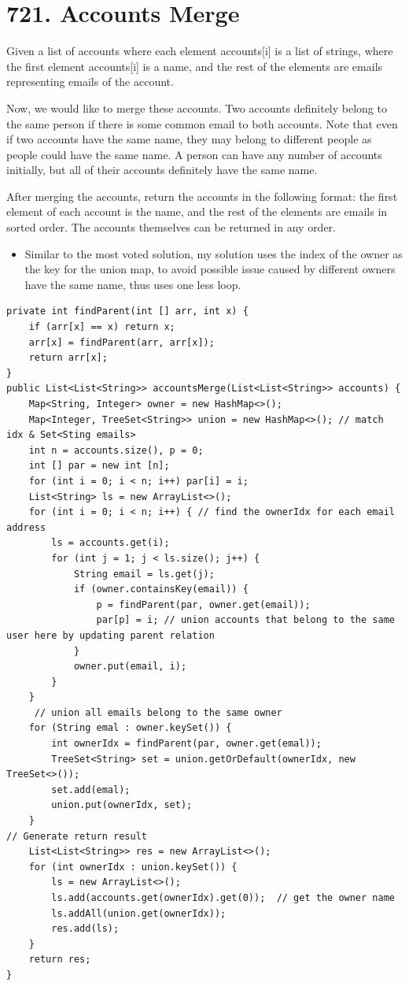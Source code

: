 \documentclass[9pt, b5paaper]{book}
\begin{document}
\section{721. Accounts Merge}
\label{sec-17-4}
Given a list of accounts where each element accounts[i] is a list of strings, where the first element accounts[i]\footnotemark[2]{} is a name, and the rest of the elements are emails representing emails of the account.

Now, we would like to merge these accounts. Two accounts definitely belong to the same person if there is some common email to both accounts. Note that even if two accounts have the same name, they may belong to different people as people could have the same name. A person can have any number of accounts initially, but all of their accounts definitely have the same name.

After merging the accounts, return the accounts in the following format: the first element of each account is the name, and the rest of the elements are emails in sorted order. The accounts themselves can be returned in any order.

\begin{itemize}
\item Similar to the most voted solution, my solution uses the index of the owner as the key for the union map, to avoid possible issue caused by different owners have the same name, thus uses one less loop.
\end{itemize}

\begin{verbatim}
private int findParent(int [] arr, int x) {
    if (arr[x] == x) return x;
    arr[x] = findParent(arr, arr[x]);
    return arr[x];
}
public List<List<String>> accountsMerge(List<List<String>> accounts) {
    Map<String, Integer> owner = new HashMap<>();
    Map<Integer, TreeSet<String>> union = new HashMap<>(); // match idx & Set<Sting emails>
    int n = accounts.size(), p = 0;
    int [] par = new int [n];
    for (int i = 0; i < n; i++) par[i] = i;
    List<String> ls = new ArrayList<>(); 
    for (int i = 0; i < n; i++) { // find the ownerIdx for each email address
        ls = accounts.get(i);
        for (int j = 1; j < ls.size(); j++) {
            String email = ls.get(j);
            if (owner.containsKey(email)) {
                p = findParent(par, owner.get(email));
                par[p] = i; // union accounts that belong to the same user here by updating parent relation
            }
            owner.put(email, i);
        }
    }
     // union all emails belong to the same owner
    for (String emal : owner.keySet()) {
        int ownerIdx = findParent(par, owner.get(emal));
        TreeSet<String> set = union.getOrDefault(ownerIdx, new TreeSet<>());
        set.add(emal);
        union.put(ownerIdx, set);
    }
// Generate return result
    List<List<String>> res = new ArrayList<>();
    for (int ownerIdx : union.keySet()) {
        ls = new ArrayList<>();
        ls.add(accounts.get(ownerIdx).get(0));  // get the owner name
        ls.addAll(union.get(ownerIdx));
        res.add(ls);
    }
    return res;
}
\end{verbatim}
\end{document}
